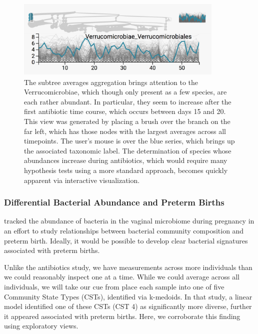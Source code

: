 \begin{figure}

{\centering \includegraphics[width=375px]{figure/treelapse/verrucomicrobiae}

}

\caption{The subtree averages aggregation brings attention to the
  Verrucomicrobiae, which though only present as a few species, are each rather
  abundant. In particular, they seem to increase after the first antibiotic time
  course, which occurs between days 15 and 20. This view was generated by
  placing a brush over the branch on the far left, which has those nodes with
  the largest averages across all timepoints. The user's mouse is over the blue
  series, which brings up the associated taxonomic label. The determination of
  species whose abundances increase during antibiotics, which would require many
  hypothesis tests using a more standard approach, becomes quickly apparent
  via interactive visualization.}\label{fig:verrucomicrobiae}
\end{figure}

\subsubsection{Differential Bacterial Abundance and Preterm
Births}\label{differential-bacterial-abundance-and-preterm-births}

\citet{digiulio2015temporal}
tracked the abundance of bacteria in the vaginal microbiome during
pregnancy in an effort to study relationships between bacterial
community composition and preterm birth. Ideally, it would be possible
to develop clear bacterial signatures associated with preterm births.

Unlike the antibiotics study, we have measurements across more
individuals than we could reasonably inspect one at a time. While we
could average across all individuals, we will take our cue from
\citep{digiulio2015temporal}
place each sample into one of five Community State Types (CSTs),
identified via k-medoids. In that study, a linear model identified one
of these CSTs (CST 4) as significantly more diverse, further it appeared
associated with preterm births. Here, we corroborate this finding using
exploratory views.

